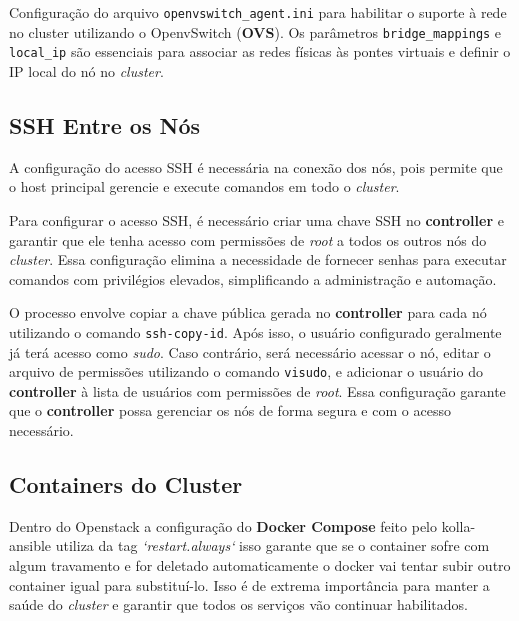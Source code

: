 \begin{listing}[h!]
    \noindent{}  
  \caption{Configuração do arquivo \texttt{openvswitch\_agent.ini} para habilitar o suporte à rede no cluster utilizando o OpenvSwitch (\textbf{OVS}). Os parâmetros \texttt{bridge\_mappings} e \texttt{local\_ip} são essenciais para associar as redes físicas às pontes virtuais e definir o IP local do nó no \textit{cluster}.}
  \label{code:config_openvswitch}
\end{listing}

\subsection{SSH Entre os Nós}
A configuração do acesso SSH é necessária na conexão dos nós, pois permite que o host principal gerencie e execute comandos em todo o \textit{cluster}.

Para configurar o acesso SSH, é necessário criar uma chave SSH no \textbf{controller} e garantir que ele tenha acesso com permissões de \textit{root} a todos os outros nós do \textit{cluster}. Essa configuração elimina a necessidade de fornecer senhas para executar comandos com privilégios elevados, simplificando a administração e automação.

O processo envolve copiar a chave pública gerada no \textbf{controller} para cada nó utilizando o comando \texttt{ssh-copy-id}. Após isso, o usuário configurado geralmente já terá acesso como \textit{sudo}. Caso contrário, será necessário acessar o nó, editar o arquivo de permissões utilizando o comando \texttt{visudo}, e adicionar o usuário do \textbf{controller} à lista de usuários com permissões de \textit{root}. Essa configuração garante que o \textbf{controller} possa gerenciar os nós de forma segura e com o acesso necessário.


\subsection {Containers do Cluster}
Dentro do Openstack a configuração do \textbf{Docker Compose} feito pelo kolla-ansible utiliza da tag \textit{`restart.always`} isso garante que se o container sofre com algum travamento e for deletado automaticamente o docker vai tentar subir outro container igual para substituí-lo. Isso é de extrema importância para manter a saúde do \textit{cluster} e garantir que todos os serviços vão continuar habilitados.

